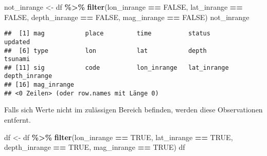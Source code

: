 \documentclass[
]{article}
\newenvironment{Shaded}{\begin{snugshade}}{\end{snugshade}}
\newcommand{\ConstantTok}[1]{\textcolor[rgb]{0.56,0.35,0.01}{#1}}
\newcommand{\FunctionTok}[1]{\textcolor[rgb]{0.13,0.29,0.53}{\textbf{#1}}}
\newcommand{\NormalTok}[1]{#1}
\newcommand{\OtherTok}[1]{\textcolor[rgb]{0.56,0.35,0.01}{#1}}
\newcommand{\SpecialCharTok}[1]{\textcolor[rgb]{0.81,0.36,0.00}{\textbf{#1}}}
\begin{document}
\begin{Shaded}
\begin{Highlighting}[]
\NormalTok{not\_inrange }\OtherTok{\textless{}{-}}\NormalTok{ df }\SpecialCharTok{\%\textgreater{}\%} 
  \FunctionTok{filter}\NormalTok{(lon\_inrange }\SpecialCharTok{==} \ConstantTok{FALSE}\NormalTok{,}
\NormalTok{         lat\_inrange }\SpecialCharTok{==} \ConstantTok{FALSE}\NormalTok{, }
\NormalTok{         depth\_inrange }\SpecialCharTok{==} \ConstantTok{FALSE}\NormalTok{,}
\NormalTok{         mag\_inrange }\SpecialCharTok{==} \ConstantTok{FALSE}\NormalTok{)}
\NormalTok{not\_inrange}
\end{Highlighting}
\end{Shaded}

\begin{verbatim}
##  [1] mag           place         time          status        updated      
##  [6] type          lon           lat           depth         tsunami      
## [11] sig           code          lon_inrange   lat_inrange   depth_inrange
## [16] mag_inrange  
## <0 Zeilen> (oder row.names mit Länge 0)
\end{verbatim}

Falls sich Werte nicht im zulässigen Bereich befinden, werden diese
Observationen entfernt.

\begin{Shaded}
\begin{Highlighting}[]
\NormalTok{df }\OtherTok{\textless{}{-}}\NormalTok{ df }\SpecialCharTok{\%\textgreater{}\%} 
  \FunctionTok{filter}\NormalTok{(lon\_inrange }\SpecialCharTok{==} \ConstantTok{TRUE}\NormalTok{,}
\NormalTok{         lat\_inrange }\SpecialCharTok{==} \ConstantTok{TRUE}\NormalTok{, }
\NormalTok{         depth\_inrange }\SpecialCharTok{==} \ConstantTok{TRUE}\NormalTok{,}
\NormalTok{         mag\_inrange }\SpecialCharTok{==} \ConstantTok{TRUE}\NormalTok{)}
\NormalTok{df}
\end{Highlighting}
\end{Shaded}
\end{document}
